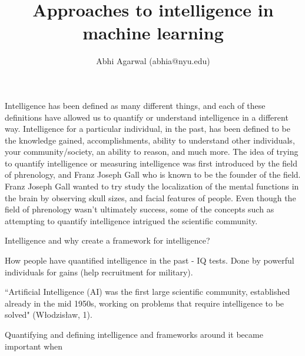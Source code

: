 \documentclass[11pt, oneside]{article}
\title{Approaches to intelligence in machine learning}
\author{Abhi Agarwal (abhia@nyu.edu)}
\date{}
\begin{document}
\maketitle

\par 


\par 
Intelligence has been defined as many different things, and each of these definitions have allowed us to quantify or understand intelligence in a different way. Intelligence for a particular individual, in the past, has been defined to be the knowledge gained, accomplishments, ability to understand other individuals, your community/society,  an ability to reason, and much more. 
The idea of trying to quantify intelligence or measuring intelligence was first introduced by the field of phrenology, and Franz Joseph Gall who is known to be the founder of the field. Franz Joseph Gall wanted to try study the localization of the mental functions in the brain by observing skull sizes, and facial features of people. Even though the field of phrenology wasn't ultimately success, some of the concepts such as attempting to quantify intelligence intrigued the scientific community. 

\par Intelligence and why create a framework for intelligence?


\par How people have quantified intelligence in the past - IQ tests. Done by powerful individuals for gains (help recruitment for military). 
\par ``Artificial Intelligence (AI) was the first large scientific community, established already in the mid 1950s, working on problems that require intelligence to be solved" (W\l{}odzis\l{}aw, 1).
\par Quantifying and defining intelligence and frameworks around it became important when 


\end{document}
